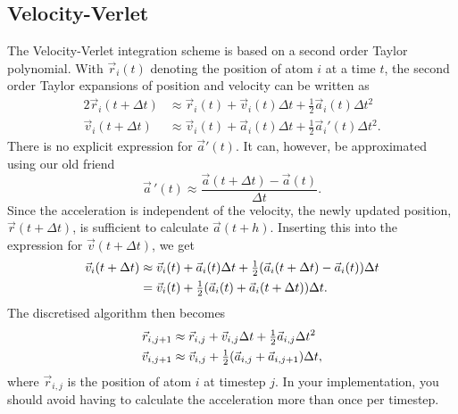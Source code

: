 \documentclass[11pt,british,a4paper]{report}
\begin{document}
\subsection{Velocity-Verlet}\label{app:verlet}
The Velocity-Verlet integration scheme is based on a second order Taylor polynomial. With \(\vec{r}_i(t)\) denoting the position of atom \(i\) at a time \(t\), the second order Taylor expansions of position and velocity can be written as
\begin{alignat*}{2}
    \vec{r}_i(t+\Delta t) &\approx \vec{r}_i(t) + \vec{v}_i(t)\Delta t + \tfrac{1}{2}\vec{a}_i(t)\Delta t^2\\
    \vec{v}_i(t+\Delta t) &\approx \vec{v}_i(t) + \vec{a}_i(t)\Delta t + \tfrac{1}{2}\vec{a}_i'(t)\Delta t^2.
\end{alignat*}
There is no explicit expression for \(\vec{a}'(t)\). It can, however, be approximated using our old friend
\[
\vec{a}\,'(t)\approx\frac{\vec{a}(t+\Delta t)-\vec{a}(t)}{\Delta t}.
\]
Since the acceleration is independent of the velocity, the newly updated position, \(\vec{r}(t+\Delta t)\), is sufficient to calculate \(\vec{a}(t+h)\). Inserting this into the expression for \(\vec{v}(t+\Delta t)\), we get
\begin{alignat*}{2}
    \vec{v}_i(t+\Delta t) &\approx \vec{v}_i(t) + \vec{a}_i(t)\Delta t + \tfrac{1}{2}\qty(\vec{a}_i(t+\Delta t)-\vec{a}_i(t))\Delta t\\
    &= \vec{v}_i(t) + \tfrac{1}{2}\qty(\vec{a}_i(t)+\vec{a}_i(t+\Delta t))\Delta t.
\end{alignat*}
The discretised algorithm then becomes
\begin{alignat*}{2}
    \vec{r}_{i,j+1} &\approx \vec{r}_{i,j} + \vec{v}_{i,j}\Delta t + \tfrac{1}{2}\vec{a}_{i,j}\Delta t^2\\
    \vec{v}_{i,j+1} &\approx \vec{v}_{i,j} + \tfrac{1}{2}\qty(\vec{a}_{i,j} + \vec{a}_{i,j+1})\Delta t,
\end{alignat*}
where \(\vec{r}_{i,j}\) is the position of atom \(i\) at timestep \(j\). In your implementation, you should avoid having to calculate the acceleration more than once per timestep.



\nocite{*}
\printbibliography{}
\end{document}
